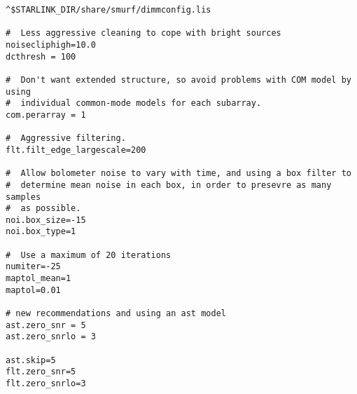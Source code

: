 \documentclass[usenatbib]{mn2e}
\begin{document}
\begin{verbatim}
^$STARLINK_DIR/share/smurf/dimmconfig.lis

#  Less aggressive cleaning to cope with bright sources
noisecliphigh=10.0
dcthresh = 100

#  Don't want extended structure, so avoid problems with COM model by using
#  individual common-mode models for each subarray.
com.perarray = 1

#  Aggressive filtering.
flt.filt_edge_largescale=200

#  Allow bolometer noise to vary with time, and using a box filter to
#  determine mean noise in each box, in order to presevre as many samples
#  as possible.
noi.box_size=-15
noi.box_type=1

#  Use a maximum of 20 iterations
numiter=-25
maptol_mean=1
maptol=0.01

# new recommendations and using an ast model
ast.zero_snr = 5
ast.zero_snrlo = 3

ast.skip=5
flt.zero_snr=5
flt.zero_snrlo=3
\end{verbatim}


\label{lastpage}
\bsp
\end{document}

